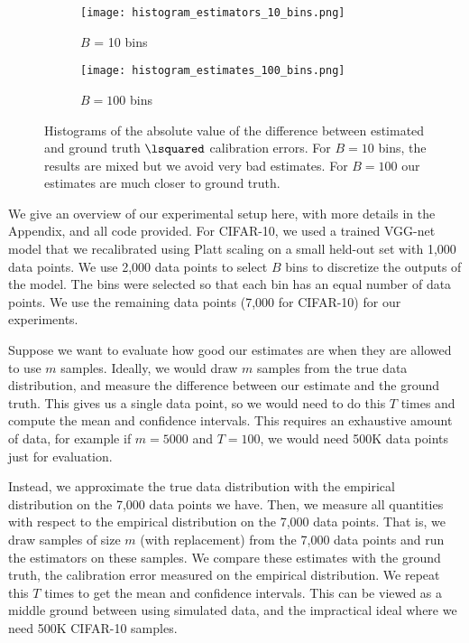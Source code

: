 \begin{figure}
  \centering
  \centering
     \begin{subfigure}[b]{0.45\textwidth}
         \centering
         \texttt{[image: histogram\_estimators\_10\_bins.png]}
         \caption{$B$ = 10 bins}
     \end{subfigure}
     \hfill
     \begin{subfigure}[b]{0.45\textwidth}
         \centering
         \texttt{[image: histogram\_estimates\_100\_bins.png]}
         \caption{$B = 100$ bins}
     \end{subfigure}
  \caption{Histograms of the absolute value of the difference between estimated and ground truth $\lsquared$ calibration errors. For $B = 10$ bins, the results are mixed but we avoid very bad estimates. For $B=100$ our estimates are much closer to ground truth.}
  \label{fig:histograms_estimators_bins}
\end{figure}


We give an overview of our experimental setup here, with more details in the Appendix, and all code provided. For CIFAR-10, we used a trained VGG-net model that we recalibrated using Platt scaling on a small held-out set with 1,000 data points. We use 2,000 data points to select $B$ bins to discretize the outputs of the model. The bins were selected so that each bin has an equal number of data points. We use the remaining data points (7,000 for CIFAR-10) for our experiments. 

Suppose we want to evaluate how good our estimates are when they are allowed to use $m$ samples. Ideally, we would draw $m$ samples from the true data distribution, and measure the difference between our estimate and the ground truth. This gives us a single data point, so we would need to do this $T$ times and compute the mean and confidence intervals. This requires an exhaustive amount of data, for example if $m = 5000$ and $T = 100$, we would need 500K data points just for evaluation.

Instead, we approximate the true data distribution with the empirical distribution on the 7,000 data points we have. Then, we measure all quantities with respect to the empirical distribution on the 7,000 data points. That is, we draw samples of size $m$ (with replacement) from the 7,000 data points and run the estimators on these samples. We compare these estimates with the ground truth, the calibration error measured on the empirical distribution. We repeat this $T$ times to get the mean and confidence intervals. This can be viewed as a middle ground between using simulated data, and the impractical ideal where we need 500K CIFAR-10 samples.


